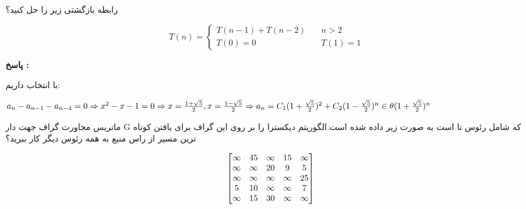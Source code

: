 \documentclass[11pt,a4paper]{exam}
\theoremstyle{definition}
\begin{document}
\begin{questions}
\question
رابطه بازگشتی زیر را حل کنید؟


\begin{latin}
\[ T(n) =
  \begin{cases}
   T(n-1)+T(n-2)       & \quad n>2\\
    T(0)=0  & \quad T(1)=1
  \end{cases}
\]
\end{latin}
\begin{flushright}
\textbf{پاسخ :}
\end{flushright}
با انتخاب  داریم:


\begin{latin}

{$
a_{n} - a_{n-1} - a_{n-4}=0\Rightarrow x^{2}-x-1=0 
\Rightarrow x=\frac {1+\sqrt5}{2} , x=\frac {1-\sqrt5}{2} \Rightarrow\\  
a_n=C_1(1+\frac{\sqrt5}{2})^2 + C_2(1-\frac{\sqrt5}{2})^n \in \theta(1+\frac{\sqrt5}{2})^n
$}
\end{latin}
\vspace*{1in}


\question
\vspace{0.5in}

\question
ماتریس مجاورت گراف جهت دار G که شامل رئوس  تا  است به صورت زیر داده شده است.الگوریتم دیکسترا را بر روی این گراف برای یافتن کوتاه ترین مسیر از راس منبع  به همه رئوس دیگر کار ببرید؟

\begin{latin}
\[
\begin{array}{lc}
  \verb|| & \begin{bmatrix}
                    \infty & 45 & \infty & 15 & \infty \\
                    \infty & \infty & 20 & 9 & 5 \\
                    \infty & \infty & \infty & \infty & 25 \\
                           5 & 10 & \infty & \infty & 7 \\
                    \infty & 15 & 30 & \infty & \infty
                  \end{bmatrix} \\[15pt]
\end{array}
\]
\end{latin}


\end{questions}
\end{document}
